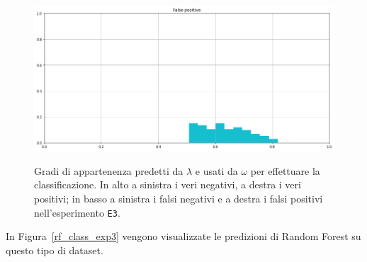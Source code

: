 \documentclass[12pt]{report}
\theoremstyle{definition}
\begin{document}
\begin{figure}
   \begin{minipage}{0.48\textwidth}
     \includegraphics[width=\linewidth]{images/experiment_beta05_disgiunti/fp.png}\label{fp_b05d}
   \end{minipage}
   \caption{Gradi di appartenenza predetti da $\lambda$ e usati da $\omega$ per effettuare la classificazione. In alto a sinistra i veri negativi, a destra i veri positivi; in basso a sinistra i falsi negativi e a destra i falsi positivi nell'esperimento \texttt{E3}.}
   \label{4cases_exp3}
\end{figure}
In Figura~\ref{rf_class_exp3} vengono visualizzate le predizioni di Random Forest su questo tipo di dataset.
\end{document}
